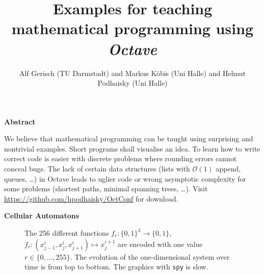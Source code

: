 \documentclass{beamer}
\title{Examples for teaching mathematical programming 
       using \emph{Octave}}
\author{Alf Gerisch (TU Darmstadt) and 
   Markus Köbis (Uni Halle) and Helmut Podhaisky (Uni Halle)}
\date{} %
\def\sect#1{\textbf{\color{blue} #1}}
\begin{document}
\begin{frame}[t]{}
\begin{multicols}{5}
\sect{Abstract}

We believe that mathematical programming can be taught using surprising and
nontrivial examples. Short programs shall visualise an idea.  To learn how to
write correct code is easier with discrete problems where rounding errors
cannot conceal bugs.  The lack of certain data structures (lists with
$\mathcal{O}(1)$ append, queues, \dots) in Octave leads to uglier code or wrong
asymptotic complexity for some problems (shortest paths, minimal spanning
trees, \dots). Visit \url{https://github.com/hpodhaisky/OctConf} 
for download. 

\medskip 

\sect{Cellular Automatons}

\begin{figure}
\caption{The 256 different functions $f_r\colon\{0,1\}^3\to\{0,1\}$, $f_r\colon (x^{i}_{j-1},x^{i}_j,x^{i}_{j+1})\mapsto x^{i+1}_j$
are encoded with one value $r\in \{0,\dots,255\}$.
The evolution of the one-dimensional system over time is from top to bottom. 
The graphics with \texttt{spy} is slow.}
\end{figure}


\end{multicols}
\end{frame}
\end{document}
